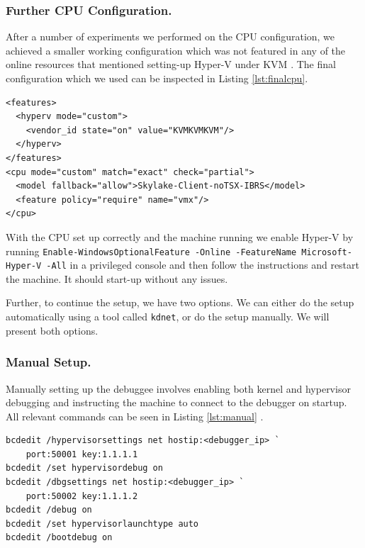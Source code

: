 \documentclass[runningheads]{llncs}
\newcommand{\cc}{\lstinline[mathescape]}
\begin{document}
\subsubsection{Further CPU Configuration.}

After a number of experiments we performed on the CPU configuration, we
achieved a smaller working configuration which was not featured in any of the
online resources that mentioned setting-up Hyper-V under KVM \cite{super_user}
\cite{redpill} \cite{petr}. The final configuration which we used can be
inspected in Listing \ref{lst:finalcpu}.

\vspace{2mm}
\begin{lstlisting}[label={lst:finalcpu}, caption={Reduced CPU configuration.}]
<features>
  <hyperv mode="custom">
    <vendor_id state="on" value="KVMKVMKVM"/>
  </hyperv>
</features>
<cpu mode="custom" match="exact" check="partial">
  <model fallback="allow">Skylake-Client-noTSX-IBRS</model>
  <feature policy="require" name="vmx"/>
</cpu>
\end{lstlisting}

With the CPU set up correctly and the machine running we enable Hyper-V by
running \cc{Enable-WindowsOptionalFeature -Online -FeatureName Microsoft-Hyper-V -All}
in a privileged console and then follow the instructions and restart the
machine. It should start-up without any issues.

Further, to continue the setup, we have two options. We can either do the setup
automatically using a tool called \cc{kdnet}, or do the setup manually. We will
present both options.

\vspace{-2mm}
\subsubsection{Manual Setup.}

Manually setting up the debuggee involves enabling both kernel and hypervisor
debugging and instructing the machine to connect to the debugger on startup.
All relevant commands can be seen in Listing \ref{lst:manual} \cite{intro_hyperv}.

\vspace{3mm}
\begin{lstlisting}[label={lst:manual},
    caption={Commands for the manual setup of the debuggee.}]
bcdedit /hypervisorsettings net hostip:<debugger_ip> `
    port:50001 key:1.1.1.1
bcdedit /set hypervisordebug on
bcdedit /dbgsettings net hostip:<debugger_ip> `
    port:50002 key:1.1.1.2
bcdedit /debug on
bcdedit /set hypervisorlaunchtype auto
bcdedit /bootdebug on
\end{lstlisting}
\end{document}
